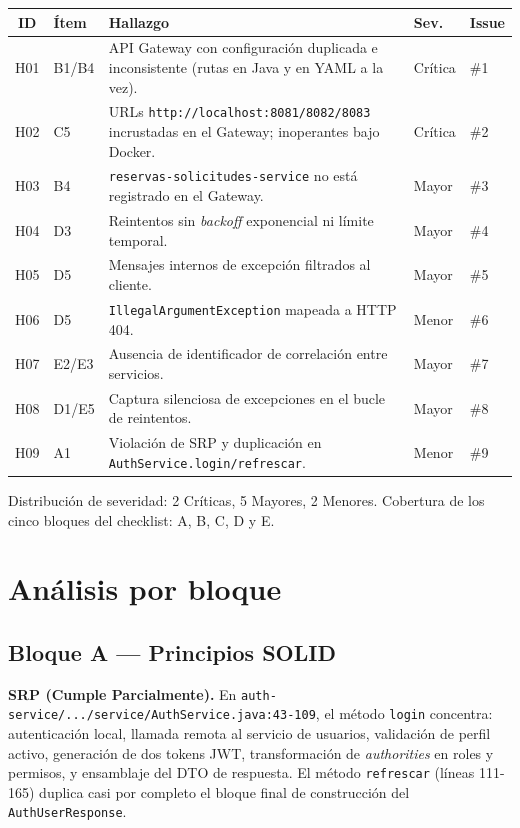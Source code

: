 \documentclass[11pt,a4paper]{article}
\begin{document}
\begin{center}
\small
\begin{tabular}{c l p{6.8cm} l l}
\toprule
\textbf{ID} & \textbf{Ítem} & \textbf{Hallazgo} & \textbf{Sev.} & \textbf{Issue} \\
\midrule
H01 & B1/B4 & API Gateway con configuración duplicada e inconsistente (rutas en Java y en YAML a la vez). & Crítica & \#1 \\
H02 & C5 & URLs \texttt{http://localhost:8081/8082/8083} incrustadas en el Gateway; inoperantes bajo Docker. & Crítica & \#2 \\
H03 & B4 & \texttt{reservas-solicitudes-service} no está registrado en el Gateway. & Mayor & \#3 \\
H04 & D3 & Reintentos sin \emph{backoff} exponencial ni límite temporal. & Mayor & \#4 \\
H05 & D5 & Mensajes internos de excepción filtrados al cliente. & Mayor & \#5 \\
H06 & D5 & \texttt{IllegalArgumentException} mapeada a HTTP 404. & Menor & \#6 \\
H07 & E2/E3 & Ausencia de identificador de correlación entre servicios. & Mayor & \#7 \\
H08 & D1/E5 & Captura silenciosa de excepciones en el bucle de reintentos. & Mayor & \#8 \\
H09 & A1 & Violación de SRP y duplicación en \texttt{AuthService.login/refrescar}. & Menor & \#9 \\
\bottomrule
\end{tabular}
\end{center}

\noindent Distribución de severidad: 2 Críticas, 5 Mayores, 2 Menores. Cobertura
de los cinco bloques del checklist: A, B, C, D y E.

\section{Análisis por bloque}

\subsection{Bloque A --- Principios SOLID}

\textbf{SRP (Cumple Parcialmente).} En
\texttt{auth-service/.../service/AuthService.java:43-109}, el método
\texttt{login} concentra: autenticación local, llamada remota al servicio de
usuarios, validación de perfil activo, generación de dos tokens JWT,
transformación de \emph{authorities} en roles y permisos, y ensamblaje del
DTO de respuesta. El método \texttt{refrescar} (líneas 111-165) duplica casi
por completo el bloque final de construcción del \texttt{AuthUserResponse}.
\end{document}
